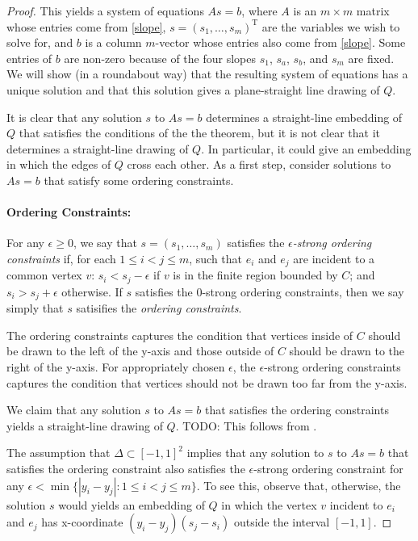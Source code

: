 \documentclass{patmorin}
\begin{document}
\begin{proof}
   This yields a system of equations $As = b$, where $A$ is
   an $m\times m$ matrix whose entries come from \eqref{slope},
   $s=(s_1,\ldots,s_m)^\mathrm{T}$ are the variables we wish to solve
   for, and $b$ is a column $m$-vector whose entries also come from
   \eqref{slope}.  Some entries of $b$ are non-zero because of the four
   slopes $s_1$, $s_a$, $s_b$, and $s_m$ are fixed.  We will show (in a
   roundabout way) that the resulting system of equations has a unique
   solution and that this solution gives a plane-straight line drawing
   of $Q$.

   It is clear that any solution $s$ to $As=b$ determines a straight-line
   embedding of $Q$ that satisfies the conditions of the the theorem,
   but it is not clear that it determines a straight-line drawing of $Q$.
   In particular, it could give an embedding in which the edges of $Q$ cross
   each other.  As a first step, consider solutions to $As=b$ that satisfy
   some ordering constraints.  

   \paragraph{Ordering Constraints:}
   For any $\epsilon \ge 0$, we say that $s=(s_1,\ldots,s_m)$ satisfies
   the \emph{$\epsilon$-strong ordering constraints} if, for each $1\le
   i<j\le m$, such that $e_i$ and $e_j$ are incident to a common vertex
   $v$: $s_i < s_j -\epsilon$ if $v$ is in the finite region bounded
   by $C$; and $s_i > s_j+\epsilon$ otherwise.  If $s$ satisfies the
   $0$-strong ordering constraints, then we say simply that $s$ satisifies
   the \emph{ordering constraints}.  

   The ordering constraints captures the condition that vertices inside of
   $C$ should be drawn to the left of the y-axis and those outside of $C$
   should be drawn to the right of the y-axis.  For appropriately chosen
   $\epsilon$, the $\epsilon$-strong ordering constraints captures the
   condition that vertices should not be drawn too far from the y-axis.

   We claim that any solution $s$ to $As=b$ that satisfies the ordering
   constraints yields a straight-line drawing of $Q$.  TODO: This follows
   from .

   The assumption that $\Delta\subset [-1,1]^2$ implies that any
   solution to $s$ to $As=b$ that satisfies the ordering constraint
   also satisfies the $\epsilon$-strong ordering constraint for any
   $\epsilon<\min\{|y_i-y_j| : 1\le i< j\le m\}$.  To see this, observe
   that, otherwise, the solution $s$ would yields an embedding of $Q$
   in which the vertex $v$ incident to $e_i$ and $e_j$ has x-coordinate
   $(y_i-y_j)(s_j-s_i)$ outside the interval $[-1,1]$.


\end{proof}
\end{document}
